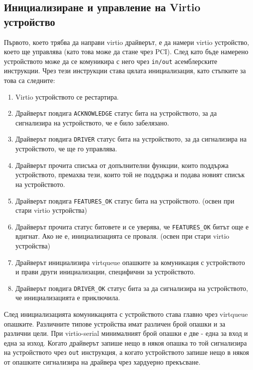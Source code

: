   \subsection{Инициализиране и управление на Virtio устройство} \label{virtioinit}
  Първото, което трябва да направи virtio драйверът, е да намери virtio устройство, което ще управлява (като това може да стане чрез PCI). След като бъде намерено устройството може да се комуникира с него чрез {\tt in/out} асемблерските инструкции. Чрез тези инструкции става цялата инициализация, като стъпките за това са следните:\cite[глава~3.1.1]{virtiodocs}
  \begin{enumerate}
    \item Virtio устройството се рестартира.
    \item Драйверът повдига {\tt ACKNOWLEDGE} статус бита на устройството, за да сигнализира на устройството, че е било забелязано.
    \item Драйверът повдига {\tt DRIVER} статус бита на устройството, за да сигнализира на устройството, че ще го управлява.
    \item Драйверът прочита списъка от допълнителни функции, които поддържа устройството, премахва тези, които той не поддържа и подава новият списък на устройството.
    \item Драйверът повдига {\tt FEATURES\_OK} статус бита на устройството. (освен при стари virtio устройства)
    \item Драйверът прочита статус битовете и се уверява, че {\tt FEATURES\_OK} битът още е вдигнат. Ако не е, инициализацията се проваля. (освен при стари virtio устройства)
    \item Драйверът инициализира virtqueue опашките за комуникация с устройството и прави други инициализации, специфични за устройството.
    \item Драйверът повдига {\tt DRIVER\_OK} статус бита за да сигнализира на устройството, че инициализацията е приключила.
  \end{enumerate}

  След инициализацията комуникацията с устройството става главно чрез virtqueue опашките. Различните типове устройства имат различен брой опашки и за различни цели. При virtio-serial минималният брой опашки е две - една за вход и една за изход.\cite[глава~5.3]{virtiodocs} Когато драйверът запише нещо в някоя опашка то той сигнализира на устройството чрез {\tt out} инструкция, а когато устройството запише нещо в някоя от опашките сигнализира на драйвера чрез хардуерно прекъсване.

